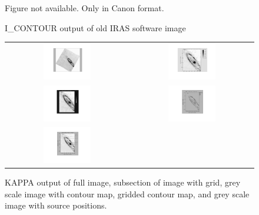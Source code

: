 \documentclass[twoside,11pt]{starlink}
\begin{document}
\begin{figure}[h]
Figure not available. Only in Canon format.
\caption{I\_CONTOUR  output of old IRAS software image}
\label{a:a3}
\end{figure}

\begin{figure}[h]
\begin{tabular}{cc}
\includegraphics[width=0.4\textwidth]{sun161_a_4_1} &
\includegraphics[width=0.4\textwidth]{sun161_a_4_2} \\
\includegraphics[width=0.4\textwidth]{sun161_a_4_3} &
\includegraphics[width=0.4\textwidth]{sun161_a_4_4} \\
\includegraphics[width=0.4\textwidth]{sun161_a_4_5} & \\
\end{tabular}
\caption[Collection of KAPPA output images]{KAPPA output of  full image, subsection of image with grid, grey
scale image with contour map, gridded contour map, and grey scale image with
source positions.}
\label{a:a4}
\end{figure}
\end{document}
